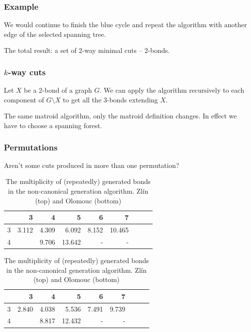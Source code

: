 \documentclass[10pt]{beamer}
\newcommand{\labelkm}{\scriptsize \diagbox[width=24pt,height=15pt]
        {\raisebox{-0pt}{k}}{ m } }
\newcommand{\evenrowcolor}{\rowcolor[gray]{0.925}}
\begin{document}


\begin{frame}
	\frametitle{Example}

    We would continue to finish the blue cycle and repeat the algorithm
    with another edge of the selected spanning tree.

    \bigskip

    The total result: a set of 2-way minimal cuts -- 2-bonds.
\end{frame}

\begin{frame}
	\frametitle{$k$-way cuts}

    Let $X$ be a 2-bond of a graph $G$. We can apply the algorithm
    recursively to each component of $G \setminus X$ to get all the
    3-bonds extending $X$.

    \bigskip

    The same matroid algorithm, only the matroid definition changes.
    In effect we have to choose a spanning forest.

\end{frame}



\begin{frame}
	\frametitle{Permutations}

	Aren't some cuts produced in more than one permutation?

\begin{table}[H]
        \caption{The multiplicity of (repeatedly) generated bonds in the
        non-canonical generation algorithm.
         Zlín (top) and Olomouc (bottom)}
        \label{tab:repeated-canonical}
    \centering
        \begin{tabular}{c|rrrrrrrr}

    \hline

    \labelkm  &        3 &         4 &         5 &         6 &        7 \\[2pt]
    \hline
           3  &    3.112 &     4.309 &     6.092 &     8.152 &   10.465 \\
    \evenrowcolor
           4  &          &     9.706 &    13.642 &         - &        - \\

        \end{tabular}
{\vskip 3mm}
        \begin{tabular}{c|rrrrrrrr}

    \hline

     \labelkm &        3 &         4 &         5 &         6 &      7 \\[2pt]
    \hline
           3  &    2.840 &     4.038 &     5.536 &     7.491 &   9.739 \\
    \evenrowcolor
           4  &          &     8.817 &    12.432 &         - &      -  \\

        \end{tabular}
\end{table}


\end{frame}
\end{document}
